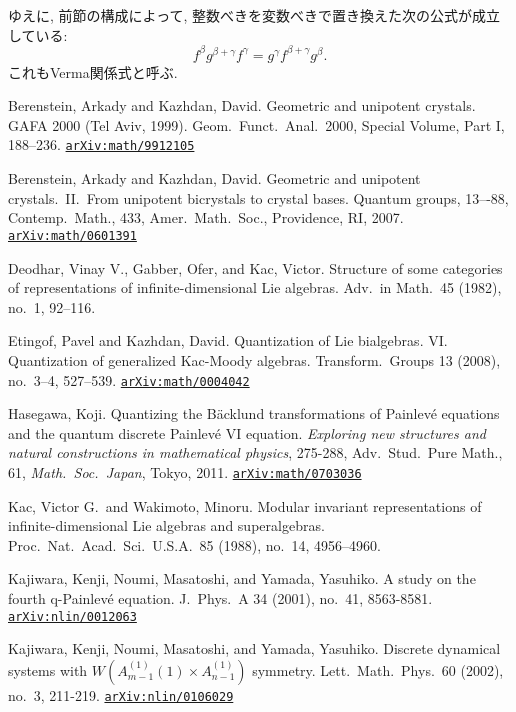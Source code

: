 \documentclass[12pt,twoside,dvipdfm]{msjproc}
\newcommand\arxivref[1]{\href{http://arxiv.org/abs/#1}{\tt arXiv:#1}}
\theoremstyle{definition} %
\theoremstyle{definition} %
\theoremstyle{definition} %
\numberwithin{theorem}{section}
\numberwithin{equation}{section}
\numberwithin{figure}{section}
\numberwithin{table}{section}
\begin{document}
ゆえに, 前節の構成によって, 
整数べきを変数べきで置き換えた次の公式が成立している:
\begin{equation*}
  f^\beta g^{\beta+\gamma} f^\gamma
 =g^\gamma f^{\beta+\gamma} g^\beta.
\end{equation*}
これもVerma関係式と呼ぶ.


\begin{thebibliography}{99}

Berenstein, Arkady and Kazhdan, David. 
Geometric and unipotent crystals. 
GAFA 2000 (Tel Aviv, 1999).  
Geom.\ Funct.\ Anal.\  2000,  Special Volume, Part I, 188--236.
\arxivref{math/9912105}

Berenstein, Arkady and Kazhdan, David. 
Geometric and unipotent crystals.\ II.\ 
From unipotent bicrystals to crystal bases. 
Quantum groups, 13–-88, Contemp.\ Math., 433, 
Amer.\ Math.\ Soc., Providence, RI, 2007.
\arxivref{math/0601391}

Deodhar, Vinay V., Gabber, Ofer, and Kac, Victor. 
Structure of some categories of representations 
of infinite-dimensional Lie algebras. 
Adv.\ in Math.\ 45 (1982), no.~1, 92--116.

Etingof, Pavel and Kazhdan, David. 
Quantization of Lie bialgebras. 
VI. Quantization of generalized Kac-Moody algebras. 
Transform.\ Groups 13 (2008), no.~3--4, 527--539. 
\arxivref{math/0004042}

Hasegawa, Koji.
Quantizing the B\"acklund transformations of Painlev\'e equations and 
the quantum discrete Painlev\'e VI equation. 
{\em Exploring new structures and natural constructions in mathematical physics}, 275-288, 
Adv.\ Stud.\ Pure Math., 61, {\em Math.\ Soc.\ Japan}, Tokyo, 2011.
\arxivref{math/0703036}

Kac, Victor G.\ and Wakimoto, Minoru.
Modular invariant representations of infinite-dimensional Lie algebras and superalgebras.
Proc.\ Nat.\ Acad.\ Sci.\ U.S.A.\ 85 (1988), no.~14, 4956--4960.

Kajiwara, Kenji, Noumi, Masatoshi, and Yamada, Yasuhiko.
A study on the fourth q-Painlev\'e equation.
J.\ Phys.\ A 34 (2001), no.~41, 8563-8581. 
\arxivref{nlin/0012063}

Kajiwara, Kenji, Noumi, Masatoshi, and Yamada, Yasuhiko.
Discrete dynamical systems with $W(A^{(1)}_{m-1}(1)\times A^{(1)}_{n-1})$ symmetry.
Lett.\ Math.\ Phys.\ 60 (2002), no.~3, 211-219. 
\arxivref{nlin/0106029}


\end{thebibliography}
\end{document}
